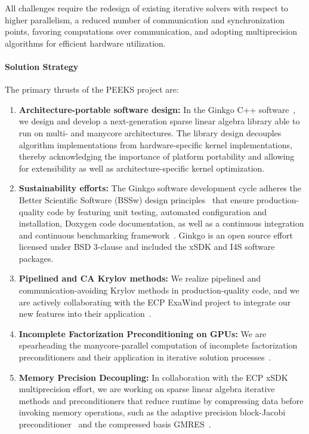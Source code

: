 All challenges require the redesign of existing iterative solvers with respect 
to higher parallelism, %
a reduced number of 
communication and synchronization points, favoring computations over 
communication, and adopting multiprecision algorithms for efficient hardware 
utilization. 

\paragraph{Solution Strategy}

The primary thrusts of the PEEKS project are:
\begin{enumerate}
    \item \textbf{Architecture-portable software design:}
	In the Ginkgo C++ software~\cite{anzt2020ginkgo}, we design and develop a 
	next-generation 
	sparse linear algebra library able to run on multi- and manycore 
	architectures. The library design decouples
	algorithm implementations from hardware-specific kernel implementations, 
	thereby acknowledging the importance of platform portability and allowing 
	for extensibility as well as architecture-specific kernel optimization. 
   \item \textbf{Sustainability efforts:}
	The Ginkgo software development cycle adheres the Better Scientific 
	Software (BSSw) design principles~\cite{betterscientificsoftware} that 
	ensure production-quality code by featuring unit testing, automated 
	configuration and installation, Doxygen code documentation, as well as a 
	continuous integration and continuous benchmarking 
	framework~\cite{pasc_anzt}. Ginkgo is an 
	open source effort licensed under BSD 3-clause and included the xSDK and 
	I4S software packages.
   \item \textbf{Pipelined and CA Krylov methods:} 
    We realize pipelined and 
	communication-avoiding Krylov methods in production-quality code, and 
	we are actively collaborating with the ECP ExaWind project to integrate 
        our new features into their application~\cite{Yamazaki-lowsynch}. 
	\item \textbf{Incomplete Factorization Preconditioning on GPUs:}  We are 
	spearheading the manycore-parallel computation of incomplete factorization 
	preconditioners and their application in iterative solution 
	processes~\cite{sisc_anzt,ipdps_anzt,anzt2020preparing}. 
	\item \textbf{Memory Precision Decoupling:}  In collaboration with the ECP 
	xSDK multiprecision effort, we are working on sparse linear algebra 
	iterative methods and preconditioners that reduce runtime by compressing 
	data before invoking memory operations, such as the adaptive precision 
	block-Jacobi preconditioner~\cite{toms_anzt} and the compressed basis 
	GMRES~\cite{aliaga2020compressed}. 
\end{enumerate}

